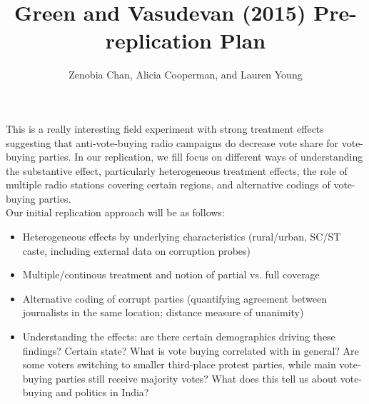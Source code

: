 \documentclass[12pt,letterpaper]{article}
\author{Zenobia Chan, Alicia Cooperman, and Lauren Young}
\title{Green and Vasudevan (2015) Pre-replication Plan}
\begin{document}
\maketitle
This is a really interesting field experiment with strong treatment effects suggesting that anti-vote-buying radio campaigns do decrease vote share for vote-buying parties. In our replication, we fill focus on different ways of understanding the substantive effect, particularly heterogeneous treatment effects, the role of multiple radio stations covering certain regions, and alternative codings of vote-buying parties.\\

Our initial replication approach will be as follows:
\begin{itemize}
\item Heterogeneous effects by underlying characteristics (rural/urban, SC/ST caste, including external data on corruption probes)
\item Multiple/continous treatment and notion of partial vs. full coverage
\item Alternative coding of corrupt parties (quantifying agreement between journalists in the same location; distance measure of unanimity)
\item Understanding the effects: are there certain demographics driving these findings? Certain state? What is vote buying correlated with in general? Are some voters switching to smaller third-place protest parties, while main vote-buying parties still receive majority votes? What does this tell us about vote-buying and politics in India?
\end{itemize}
\end{document}
